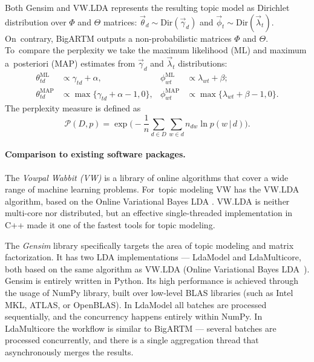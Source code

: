 \documentclass[russian]{llncs}
\newcommand{\cond}{\mspace{3mu}{|}\mspace{3mu}}
\begin{document}
Both Gensim and VW.LDA represents the resulting topic model as Dirichlet distribution over $\Phi$ and $\Theta$ matrices:
$\vec{\theta}_{d} \sim \text{Dir}(\vec{\gamma}_d)$ and
$\vec{\phi}_{t} \sim \text{Dir}(\vec{\lambda}_t)$.
On~contrary, BigARTM outputs a non-probabilistic matrices $\Phi$ and $\Theta$.
To~compare the perplexity we take the maximum likelihood (ML) and maximum a~posteriori (MAP) estimates
from $\vec{\gamma}_d$ and $\vec{\lambda}_t$ distributions:
\begin{align*}
	\theta^{\mathrm{ML}}_{td} &\propto \gamma_{td}+\alpha, &
    \phi^{\mathrm{ML}}_{wt} &\propto \lambda_{wt}+\beta;
\\
	\theta^{\mathrm{MAP}}_{td} &\propto \max\{\gamma_{td}+\alpha-1,0\}, &
    \phi^{\mathrm{MAP}}_{wt} &\propto \max\{\lambda_{wt}+\beta-1,0\}.
\end{align*}
The perplexity measure is defined as
\begin{equation}
    \label{eq:perplexity}
    \mathscr{P}(D, p) =
        \exp \biggl( - \frac{1}{n} \sum_{d \in D} \sum_{w \in d} n_{dw} \ln p(w \cond d) \biggr).
\end{equation}

\paragraph{Comparison to existing software packages.}

The \emph{Vowpal Wabbit (VW)} is a library
of online algorithms that cover a wide range of machine learning problems. %
For~topic modeling VW has the VW.LDA algorithm, based on the Online Variational Bayes LDA \cite{hoffman10online}.
VW.LDA is neither multi-core nor distributed,
but an effective single-threaded implementation in C++ made it one of the fastest tools for topic modeling.%

The \emph{Gensim} library specifically targets the area of topic modeling and matrix factorization.
It has two LDA implementations --- LdaModel and LdaMulticore,
both based on the same algorithm as VW.LDA (Online Variational Bayes LDA~\cite{hoffman10online}).
Gensim is entirely written in Python. Its high performance is achieved through the usage of NumPy library,
built over low-level BLAS libraries (such as Intel MKL, ATLAS, or OpenBLAS).
In LdaModel all batches are processed sequentially, and the concurrency happens entirely within NumPy. %
In LdaMulticore the workflow is similar to BigARTM --- several batches are processed concurrently, and there is a single aggregation thread that asynchronously merges the results.
\end{document}
